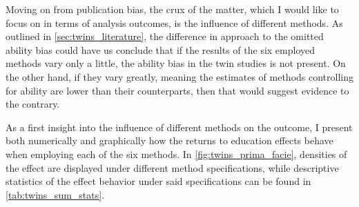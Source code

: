 Moving on from publication bias, the crux of the matter, which I would like to focus on in terms of analysis outcomes, is the influence of different methods. As outlined in \autoref{sec:twins_literature}, the difference in approach to the omitted ability bias could have us conclude that if the results of the six employed methods vary only a little, the ability bias in the twin studies is not present. On the other hand, if they vary greatly, meaning the estimates of methods controlling for ability are lower than their counterparts, then that would suggest evidence to the contrary.

As a first insight into the influence of different methods on the outcome, I present both numerically and graphically how the returns to education effects behave when employing each of the six methods. In \autoref{fig:twins_prima_facie}, densities of the effect are displayed under different method specifications, while descriptive statistics of the effect behavior under said specifications can be found in \autoref{tab:twins_sum_stats}.

